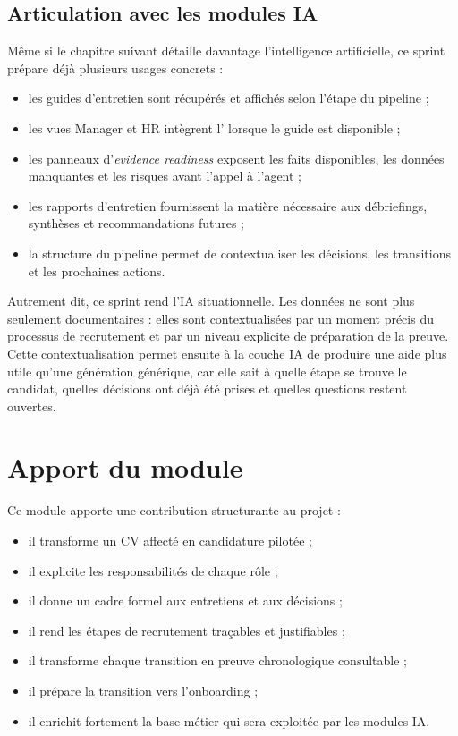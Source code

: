 \subsection{Articulation avec les modules IA}
Même si le chapitre suivant détaille davantage l'intelligence artificielle, ce sprint prépare déjà plusieurs usages concrets :
\begin{itemize}
  \item les guides d'entretien sont récupérés et affichés selon l'étape du pipeline ;
  \item les vues Manager et HR intègrent l' lorsque le guide est disponible ;
  \item les panneaux d'\textit{evidence readiness} exposent les faits disponibles, les données manquantes et les risques avant l'appel à l'agent ;
  \item les rapports d'entretien fournissent la matière nécessaire aux débriefings, synthèses et recommandations futures ;
  \item la structure du pipeline permet de contextualiser les décisions, les transitions et les prochaines actions.
\end{itemize}
Autrement dit, ce sprint rend l'IA situationnelle. Les données ne sont plus seulement documentaires : elles sont contextualisées par un moment précis du processus de recrutement et par un niveau explicite de préparation de la preuve. Cette contextualisation permet ensuite à la couche IA de produire une aide plus utile qu'une génération générique, car elle sait à quelle étape se trouve le candidat, quelles décisions ont déjà été prises et quelles questions restent ouvertes.

\section{Apport du module}
Ce module apporte une contribution structurante au projet :
\begin{itemize}
  \item il transforme un CV affecté en candidature pilotée ;
  \item il explicite les responsabilités de chaque rôle ;
  \item il donne un cadre formel aux entretiens et aux décisions ;
  \item il rend les étapes de recrutement traçables et justifiables ;
  \item il transforme chaque transition en preuve chronologique consultable ;
  \item il prépare la transition vers l'onboarding ;
  \item il enrichit fortement la base métier qui sera exploitée par les modules IA.
\end{itemize}

